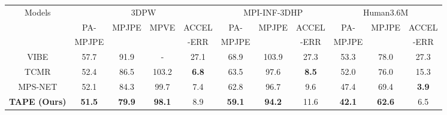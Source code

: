 \documentclass[runningheads]{llncs}
\begin{document}
\begin{table*}[t]
\begin{adjustbox}{width={\textwidth},,totalheight={\textheight},keepaspectratio}

\begin{tabular}{|c|cccc|ccc|ccc|}
\hline
{Models} & \multicolumn{4}{c|}{3DPW}                                                                                                   & \multicolumn{3}{c|}{MPI-INF-3DHP}                                                      & \multicolumn{3}{c|}{Human3.6M}                                                 \\ \cline{2-11} 
                        & \multicolumn{1}{c|}{PA-}      & \multicolumn{1}{c|}{MPJPE}         & \multicolumn{1}{c|}{MPVE}           & ACCEL    & \multicolumn{1}{c|}{PA-}      & \multicolumn{1}{c|}{MPJPE}         & ACCEL & \multicolumn{1}{c|}{PA-}      & \multicolumn{1}{c|}{MPJPE}         & ACCEL \\ 
                        & \multicolumn{1}{c|}{MPJPE}      & \multicolumn{1}{c|}{ }         & \multicolumn{1}{c|}{ }           & -ERR    & \multicolumn{1}{c|}{MPJPE}      & \multicolumn{1}{c|}{ }         & -ERR & \multicolumn{1}{c|}{MPJPE}      & \multicolumn{1}{c|}{}         & -ERR \\ \hline
VIBE                    & \multicolumn{1}{c|}{57.7}          & \multicolumn{1}{c|}{91.9}          & \multicolumn{1}{c|}{-}             & 27.1         & \multicolumn{1}{c|}{68.9}          & \multicolumn{1}{c|}{103.9}         & 27.3         & \multicolumn{1}{c|}{53.3}          & \multicolumn{1}{c|}{78.0}          & 27.3         \\ \hline
TCMR                    & \multicolumn{1}{c|}{52.4}          & \multicolumn{1}{c|}{86.5}          & \multicolumn{1}{c|}{103.2}         & \textbf{6.8} & \multicolumn{1}{c|}{63.5}          & \multicolumn{1}{c|}{97.6}          & \textbf{8.5} & \multicolumn{1}{c|}{52.0}          & \multicolumn{1}{c|}{76.0}          & 15.3         \\ \hline
MPS-NET                 & \multicolumn{1}{c|}{52.1}          & \multicolumn{1}{c|}{84.3}          & \multicolumn{1}{c|}{99.7}          & 7.4          & \multicolumn{1}{c|}{62.8}          & \multicolumn{1}{c|}{96.7}          & 9.6          & \multicolumn{1}{c|}{47.4}          & \multicolumn{1}{c|}{69.4}          & \textbf{3.9} \\ \hline
\textbf{TAPE (Ours)}                 & \multicolumn{1}{c|}{\textbf{51.5}} & \multicolumn{1}{c|}{\textbf{79.9}} & \multicolumn{1}{c|}{\textbf{98.1}} & 8.9         & \multicolumn{1}{c|}{\textbf{59.1}} & \multicolumn{1}{c|}{\textbf{94.2}} & 11.6         & \multicolumn{1}{c|}{\textbf{42.1}} & \multicolumn{1}{c|}{\textbf{62.6}} & 6.5         \\ \hline

\end{tabular}
\end{adjustbox}
\end{table*}
\end{document}
